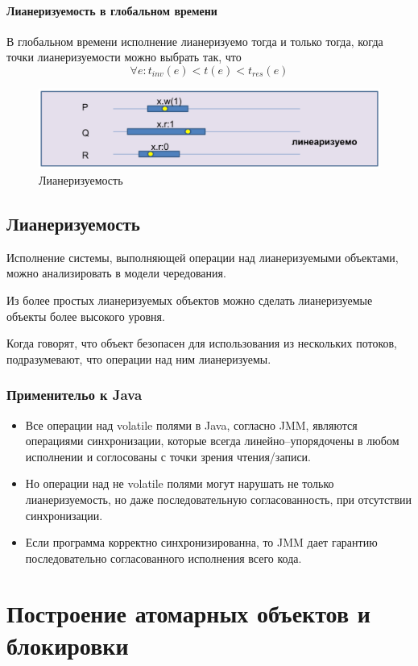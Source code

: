 \documentclass[10pt,a4paper,oneside,titlepage]{article}
\theoremstyle{plain}
\theoremstyle{defenition}
\begin{document}
\paragraph{Лианеризуемость в глобальном времени}

В глобальном времени исполнение лианеризуемо тогда и только тогда, когда точки лианеризуемости можно выбрать так, что
$$
\forall e\colon t_{inv}(e)<t(e)<t_{res}(e)
$$

\begin{figure}[h!]
	\centering
	\includegraphics[width=0.5\linewidth]{pictures/Model11}
	\caption{Лианеризуемость}
	\label{fig:model11}
\end{figure}

\subsection{Лианеризуемость}
Исполнение системы, выполняющей операции над лианеризуемыми объектами, можно анализировать в модели чередования.

Из более простых лианеризуемых объектов можно сделать лианеризуемые объекты более высокого уровня. 

Когда говорят, что объект безопасен для использования из нескольких потоков, подразумевают, что операции над ним лианеризуемы.

\subsubsection{Применительо к Java}
\begin{itemize}
	\item Все операции над volatile полями в Java, согласно JMM, являются операциями синхронизации, которые всегда линейно--упорядочены в любом исполнении и соглосованы с точки зрения чтения/записи.
	\item Но операции над не volatile полями могут нарушать не только лианеризуемость, но даже последовательную согласованность, при отсутствии синхронизации.
	\item Если программа корректно синхронизированна, то JMM дает гарантию последовательно согласованного исполнения всего кода. 
\end{itemize}

\section{Построение атомарных объектов и блокировки}
\end{document}

